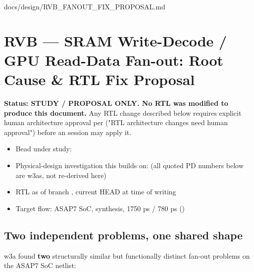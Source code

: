 \begin{relocated}{docs/design/RVB_FANOUT_FIX_PROPOSAL.md}
\section{RVB --- SRAM Write-Decode / GPU Read-Data Fan-out: Root Cause
\& RTL Fix Proposal}\label{tm:pd:rvb-fanout-fix}

\textbf{Status: STUDY / PROPOSAL ONLY. No RTL was modified to produce
this document.} Any RTL change described below requires explicit human
architecture approval per  ("RTL architecture changes
need human approval") before an  session
may apply it.

\begin{itemize}
\tightlist
\item
  Bead under study: 
\item
  Physical-design investigation this builds on:
   (all quoted PD numbers below are
  w3a\textquotesingle s, not re-derived here)
\item
  RTL as of branch , current HEAD at
  time of writing
\item
  Target flow: ASAP7 SoC,  synthesis,
   1750 ps /  780 ps
  ()
\end{itemize}

\subsection{Two independent problems, one shared shape}\label{tm:pd:rvb-fanout-fix:0-two-independent-problems-one-shared-shape}

w3a found \textbf{two} structurally similar but functionally distinct
fan-out problems on the ASAP7  SoC netlist:

{\footnotesize\setlength{\tabcolsep}{3pt}

}
\end{relocated}
